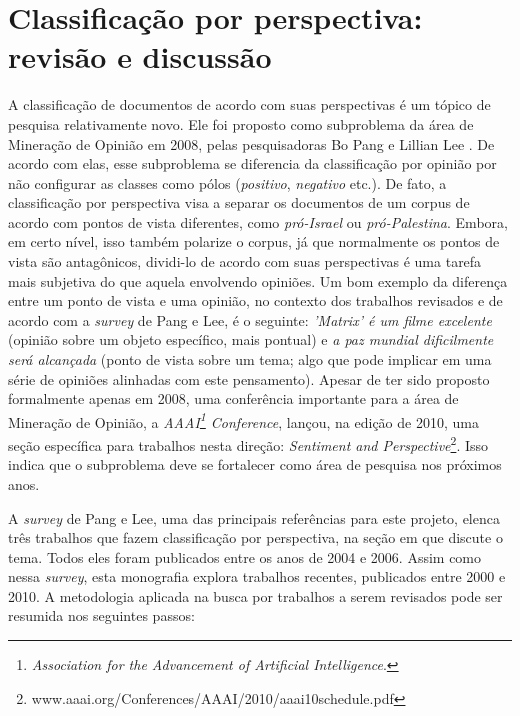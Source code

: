 \chapter{Classificação por perspectiva: revisão e discussão}
\label{chap3}

A classificação de documentos de acordo com suas perspectivas é um tópico de pesquisa relativamente novo. Ele foi proposto como subproblema da área de Mineração de Opinião em 2008, pelas pesquisadoras Bo Pang e Lillian Lee \cite{omsa}. De acordo com elas, esse subproblema se diferencia da classificação por opinião por não configurar as classes como pólos (\emph{positivo}, \emph{negativo} etc.). De fato, a classificação por perspectiva visa a separar os documentos de um corpus de acordo com pontos de vista diferentes, como \emph{pró-Israel} ou \emph{pró-Palestina}. Embora, em certo nível, isso também polarize o corpus, já que normalmente os pontos de vista são antagônicos, dividi-lo de acordo com suas perspectivas é uma tarefa mais subjetiva do que aquela envolvendo opiniões. Um bom exemplo da diferença entre um ponto de vista e uma opinião, no contexto dos trabalhos revisados e de acordo com a \emph{survey} de Pang e Lee, é o seguinte: \emph{'Matrix' é um filme excelente} (opinião sobre um objeto específico, mais pontual) e \emph{a paz mundial dificilmente será alcançada} (ponto de vista sobre um tema; algo que pode implicar em uma série de opiniões alinhadas com este pensamento). Apesar de ter sido proposto formalmente apenas em 2008, uma conferência importante para a área de Mineração de Opinião, a \emph{AAAI\footnote{\emph{Association for the Advancement of Artificial Intelligence}.} Conference}, lançou, na edição de 2010, uma seção específica para trabalhos nesta direção: \emph{Sentiment and Perspective}\footnote{www.aaai.org/Conferences/AAAI/2010/aaai10schedule.pdf}. Isso indica que o subproblema deve se fortalecer como área de pesquisa nos próximos anos.

A \emph{survey} de Pang e Lee, uma das principais referências para este projeto, elenca três trabalhos que fazem classificação por perspectiva, na seção em que discute o tema. Todos eles foram publicados entre os anos de 2004 e 2006. Assim como nessa \emph{survey}, esta monografia explora trabalhos recentes, publicados entre 2000 e 2010. A metodologia aplicada na busca por trabalhos a serem revisados pode ser resumida nos seguintes passos:

